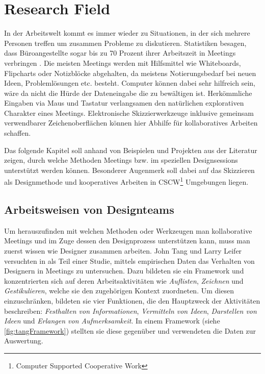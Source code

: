 \chapter{Research Field}\label{ch:research}
In der Arbeitswelt kommt es immer wieder zu Situationen, in der sich mehrere Personen treffen um zusammen Probleme zu diskutieren. Statistiken besagen, dass Büroangestellte sogar bis zu 70 Prozent ihrer Arbeitszeit in Meetings verbringen \citep{panko:1993}. Die meisten Meetings werden mit Hilfsmittel wie Whiteboards, Flipcharts oder Notizblöcke abgehalten, da meistens Notierungsbedarf bei neuen Ideen, Problemlösungen etc. besteht. Computer können dabei sehr hilfreich sein, wäre da nicht die Hürde der Dateneingabe die zu bewältigen ist. Herkömmliche Eingaben via Maus und Tastatur verlangsamen den natürlichen explorativen Charakter eines Meetings. Elektronische Skizzierwerkzeuge inklusive gemeinsam verwendbarer Zeichenoberflächen können hier Abhilfe für kollaboratives Arbeiten schaffen. 

\medskip Das folgende Kapitel soll anhand von Beispielen und Projekten aus der Literatur zeigen, durch welche Methoden Meetings bzw. im speziellen Designsessions unterstützt werden können. Besonderer Augenmerk soll dabei auf das Skizzieren als Designmethode und kooperatives Arbeiten in CSCW\footnote{Computer Supported Cooperative Work} Umgebungen liegen.

\section{Arbeitsweisen von Designteams}
Um herauszufinden mit welchen Methoden oder Werkzeugen man kollaborative Meetings und im Zuge dessen den Designprozess unterstützen kann, muss man zuerst wissen wie Designer zusammen arbeiten. John Tang und Larry Leifer versuchten in \citep{Tang:1988p279} als Teil einer Studie, mittels empirischen Daten das Verhalten von Designern in Meetings zu untersuchen. Dazu bildeten sie ein Framework und konzentrierten sich auf deren Arbeitsaktivitäten wie \emph{Auflisten}, \emph{Zeichnen} und \emph{Gestikulieren}, welche sie den zugehörigen Kontext zuordneten. Um diesen einzuschränken, bildeten sie vier Funktionen, die den Hauptzweck der Aktivitäten beschreiben: \emph{Festhalten von Informationen}, \emph{Vermitteln von Ideen}, \emph{Darstellen von Ideen} und \emph{Erlangen von Aufmerksamkeit}. In einem Framework (siehe \autoref{fig:tangFramework}) stellten sie diese gegenüber und verwendeten die Daten zur Auswertung.


